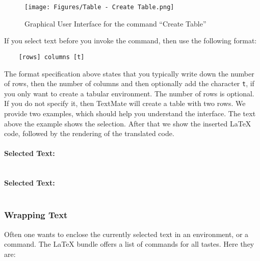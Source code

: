 \documentclass[11pt, x11names]{article}
\begin{document}
\begin{figure}[H]
  \centering
    \texttt{[image: Figures/Table - Create Table.png]}
  \caption{Graphical User Interface for the command “Create Table”}
  \label{fig:Figures_Table_-_Create_Table}
\end{figure}

If you select text before you invoke the command, then use the following format:

\begin{verbatim}
    [rows] columns [t]
\end{verbatim}

The format specification above states that you typically write down the number of rows, then the number of columns and then optionally add the character \texttt{t}, if you only want to create a tabular environment. The number of rows is optional. If you do not specify it, then TextMate will create a table with two rows. We provide two examples, which should help you understand the interface. The text above the example shows the selection. After that we show the inserted LaTeX code, followed by the rendering of the translated code.

\paragraph{Selected Text: }

\inputminted[frame=lines]{tex}{TeX/Table_2_3.tex}


\paragraph{Selected Text: }

\inputminted[frame=lines]{tex}{TeX/Table_3_4_t.tex}


\subsubsection{Wrapping Text}

Often one wants to enclose the currently selected text in an environment, or a command. The LaTeX bundle offers a list of  commands for all tastes. Here they are:
\end{document}
